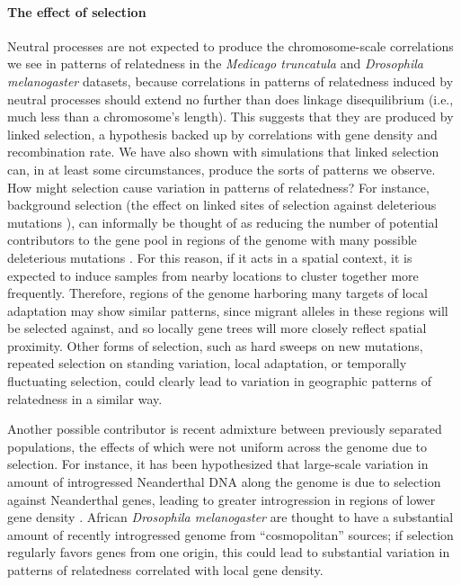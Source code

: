 \documentclass[11pt, oneside]{article}   	%
\newcommand\citet{\cite}
\newcommand\citep{\cite}
\renewcommand{\revpoint}[2]{\relax}
\renewcommand{\llabel}[1]{\relax}
\begin{document}
\paragraph{The effect of selection}
Neutral processes are not expected to produce the chromosome-scale correlations we see in
patterns of relatedness 
in the \textit{Medicago truncatula} and \textit{Drosophila melanogaster} datasets, \llabel{ll:not_neutral}
because correlations in patterns of relatedness induced by neutral processes \revpoint{AE}{4}
should extend no further than does linkage disequilibrium
(i.e., much less than a chromosome's length).
This suggests that they are produced by linked selection,
a hypothesis backed up by correlations with gene density and recombination rate.
We have also shown with simulations that linked selection can, in at least some circumstances,
produce the sorts of patterns we observe.
How might selection cause variation in patterns of relatedness?
For instance, background selection
(the effect on linked sites of selection against deleterious mutations
\citet{charlesworth1993effect,charlesworth2013background}),
can informally be thought of as reducing the number of potential contributors to the gene pool 
in regions of the genome with many possible deleterious mutations \citep{hudson1995deleterious}.
For this reason, if it acts in a spatial context, it is expected to induce samples from nearby locations to cluster together more frequently.
Therefore, regions of the genome harboring many targets of local adaptation may show similar patterns,
since migrant alleles in these regions will be selected against,
and so locally gene trees will more closely reflect spatial proximity.
Other forms of selection, such as hard sweeps on new mutations,
repeated selection on standing variation, local adaptation,
or temporally fluctuating selection,
could clearly lead to variation 
in geographic patterns of relatedness in a similar way.

Another possible contributor is recent admixture between previously separated populations,
the effects of which were not uniform across the genome due to selection. \revpoint{2}{6}
For instance, it has been hypothesized that large-scale variation in amount of introgressed Neanderthal DNA along the genome
is due to selection against Neanderthal genes, leading to greater introgression in regions of lower gene density
\citep{harris2016genetic,juric2016strength}.
African \textit{Drosophila melanogaster} are thought to have a substantial amount of recently introgressed genome from ``cosmopolitan'' sources;
if selection regularly favors genes from one origin,
this could lead to substantial variation in patterns of relatedness correlated with local gene density.
\end{document}
